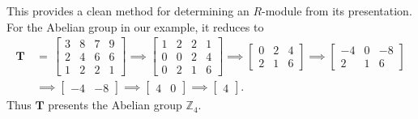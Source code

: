 \documentclass[11pt]{article}
\newcommand{\mat}[1]{\mathbf{#1}}
\begin{document}
This provides a clean method for determining an $R$-module from its presentation. For the Abelian group in our example, it reduces to
\begin{align*}
  \mat{T} \, & = \, \begin{bmatrix} 3 & 8 & 7 & 9 \\ 2 & 4 & 6 & 6 \\ 1 & 2 & 2 & 1 \end{bmatrix} \implies \begin{bmatrix} 1 & 2 & 2 & 1 \\ 0 & 0 & 2 & 4 \\ 0 & 2 & 1 & 6 \end{bmatrix} \implies \begin{bmatrix} 0 & 2 & 4 \\ 2 & 1 & 6 \end{bmatrix} \implies \begin{bmatrix} -4 & 0 & -8 \\ 2 & 1 & 6 \end{bmatrix} \\
             & \implies \begin{bmatrix} -4 & -8 \end{bmatrix} \implies \begin{bmatrix} 4 & 0 \end{bmatrix} \implies \begin{bmatrix} 4 \end{bmatrix}.
\end{align*}
Thus $\mat{T}$ presents the Abelian group $\mathbb{Z}_{4}$.

\end{document}
